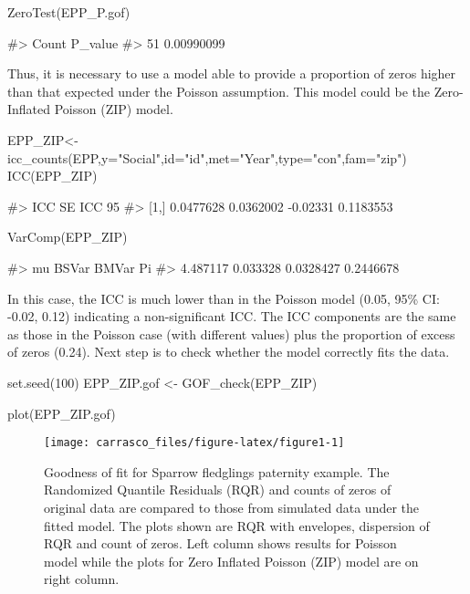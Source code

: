 \begin{Schunk}
\begin{Sinput}
ZeroTest(EPP_P.gof)
\end{Sinput}
\begin{Soutput}
#>  Count    P_value
#>     51 0.00990099
\end{Soutput}
\end{Schunk}

Thus, it is necessary to use a model able to provide a proportion of
zeros higher than that expected under the Poisson assumption. This model
could be the Zero-Inflated Poisson (ZIP) model.

\begin{Schunk}
\begin{Sinput}
EPP_ZIP<-icc_counts(EPP,y="Social",id="id",met="Year",type="con",fam="zip")
ICC(EPP_ZIP)
\end{Sinput}
\begin{Soutput}
#>            ICC    SE ICC 95% CI LL 95% CI UL
#> [1,] 0.0477628 0.0362002  -0.02331 0.1183553
\end{Soutput}
\begin{Sinput}
VarComp(EPP_ZIP)
\end{Sinput}
\begin{Soutput}
#>        mu    BSVar     BMVar        Pi
#>  4.487117 0.033328 0.0328427 0.2446678
\end{Soutput}
\end{Schunk}

In this case, the ICC is much lower than in the Poisson model (0.05,
95\% CI: -0.02, 0.12) indicating a non-significant ICC. The ICC
components are the same as those in the Poisson case (with different
values) plus the proportion of excess of zeros (0.24). Next step is to
check whether the model correctly fits the data.

\begin{Schunk}
\begin{Sinput}
set.seed(100)
EPP_ZIP.gof <- GOF_check(EPP_ZIP)
\end{Sinput}
\end{Schunk}

\begin{Schunk}
\begin{Sinput}
plot(EPP_ZIP.gof)
\end{Sinput}
\end{Schunk}

\begin{Schunk}
\begin{figure}
\texttt{[image: carrasco\_files/figure-latex/figure1-1]} \caption[Goodness of fit for Sparrow fledglings paternity example]{Goodness of fit for Sparrow fledglings paternity example. The Randomized Quantile Residuals (RQR) and counts of zeros of original data are compared to those from simulated data under the fitted model. The plots shown are RQR with envelopes, dispersion of RQR and count of zeros. Left column shows results for Poisson model while the plots for Zero Inflated Poisson (ZIP) model are on right column.}\label{fig:figure1}
\end{figure}
\end{Schunk}

